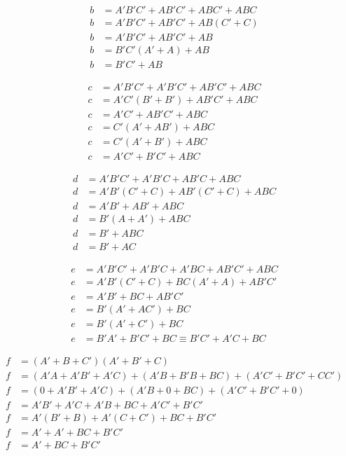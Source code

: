 \documentclass[
	article,			%
	11pt,				%
	oneside,			%
	a4paper,			%
	english,			%
	brazil,				%
	sumario=tradicional
	]{abntex2}
\begin{document}
\begin{equation}
\begin{split}
b &= A'B'C' + AB'C' + ABC' + ABC  \\
b &= A'B'C' + AB'C' + AB(C' + C)\\
b &= A'B'C' + AB'C' + AB\\
b &= B'C'(A' + A) + AB\\
b &= B'C' + AB
\label{math:display-b}
\end{split}
\end{equation}

\begin{equation}
\begin{split}
c &= A'B'C' + A'B'C' + AB'C' + ABC \\
c &= A'C'(B' + B') + AB'C' + ABC \\
c &= A'C' + AB'C' + ABC \\
c &= C'(A' + AB') + ABC \\
c &= C'(A' + B') + ABC \\
c &= A'C' + B'C' + ABC
\label{math:display-c}
\end{split}
\end{equation}

\begin{equation}
\begin{split}
d &= A'B'C' + A'B'C + AB'C + ABC\\
d &= A'B'(C' + C) + AB'(C' + C) + ABC\\
d &= A'B' + AB' + ABC\\
d &= B'(A + A') + ABC\\
d &= B' + ABC\\
d &= B' + AC
\label{math:display-d}
\end{split}
\end{equation}

\begin{equation}
\begin{split}
e &= A'B'C' + A'B'C + A'BC + AB'C' + ABC\\
e &= A'B'(C' + C) + BC(A' + A) + AB'C'\\
e &= A'B' + BC + AB'C'\\
e &= B'(A' + AC') + BC\\
e &= B'(A' + C') + BC\\
e &= B'A' + B'C' + BC \equiv B'C' + A'C + BC
\label{math:display-e}
\end{split}
\end{equation}

\begin{equation}
\begin{split}
f &= (A' + B + C')(A' + B' + C)\\
f &= (A'A + A'B' + A'C) + (A'B + B'B + BC) + (A'C' + B'C' + CC')\\
f &= (0 + A'B' + A'C) + (A'B + 0 + BC) + (A'C' + B'C' + 0)\\
f &= A'B' + A'C + A'B + BC + A'C' + B'C'\\
f &= A'(B' + B) + A'(C + C') + BC + B'C'\\
f &= A' + A' + BC + B'C'\\
f &= A' + BC + B'C'
\label{math:display-f}
\end{split}
\end{equation}
\end{document}
